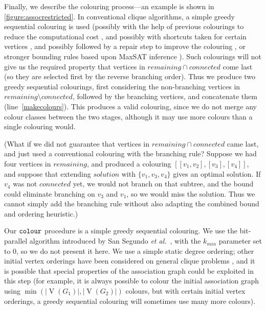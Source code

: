 \documentclass{llncs}
\newcommand{\lineref}[1]{line~\ref{#1}}
\begin{document}
Finally, we describe the colouring process---an example is shown in \cref{figure:assocrestricted}.
In conventional clique algorithms, a simple greedy sequential colouring is used (possibly with the
help of previous colourings to reduce the computational cost \cite{DBLP:conf/lion/NikolaevBS15}, and
possibly with shortcuts taken for certain vertices \cite{DBLP:journals/cor/SegundoT14}, and possibly
followed by a repair step to improve the colouring \cite{DBLP:conf/walcom/TomitaSHTW10}, or stronger
bounding rules based upon MaxSAT inference
\cite{DBLP:conf/ictai/LiFX13,DBLP:conf/lion/LiJX15,DBLP:journals/cor/SegundoNB15}).  Such colourings
will not give us the required property that vertices in $\mathit{remaining} \cap \mathit{connected}$
come last (so they are selected first by the reverse branching order). Thus we produce two greedy
sequential colourings, first considering the non-branching vertices in $\mathit{remaining} \setminus
\mathit{connected}$, followed by the branching vertices, and concatenate them
(\lineref{makecolours}). This produces a valid colouring, since we do not merge any colour classes
between the two stages, although it may use more colours than a single colouring would.

(What if we did not guarantee that vertices in $\mathit{remaining} \cap \mathit{connected}$ came
last, and just used a conventional colouring with the branching rule?  Suppose we had four vertices
in $\mathit{remaining}$, and produced a colouring $[[v_1, v_2], [v_3], [v_4]]$, and suppose that
extending $\mathit{solution}$ with $\{ v_1, v_3, v_4 \}$ gives an optimal solution. If $v_4$ was not
$\mathit{connected}$ yet, we would not branch on that subtree, and the bound could eliminate
branching on $v_3$ and $v_1$, so we would miss the solution. Thus we cannot simply add the branching
rule without also adapting the combined bound and ordering heuristic.)

Our $\FuncSty{colour}$ procedure is a simple greedy sequential colouring. We use the bit-parallel
algorithm introduced by San Segundo \textit{et al.}\ \cite{DBLP:journals/cor/SegundoRJ11}, with the
$k_{min}$ parameter set to $0$, so we do not present it here. We use a simple static degree
ordering; other initial vertex orderings have been considered on general clique problems
\cite{DBLP:journals/algorithms/Prosser12,DBLP:conf/lion/SegundoLB14}, and it is possible that
special properties of the association graph could be exploited in this step (for example, it is
always possible to colour the initial association graph using
$\operatorname{min}(\left|\operatorname{V}(G_1)\right|, \left|\operatorname{V}(G_2)\right|)$
colours, but with certain initial vertex orderings, a greedy sequential colouring will sometimes use
many more colours).
\end{document}

